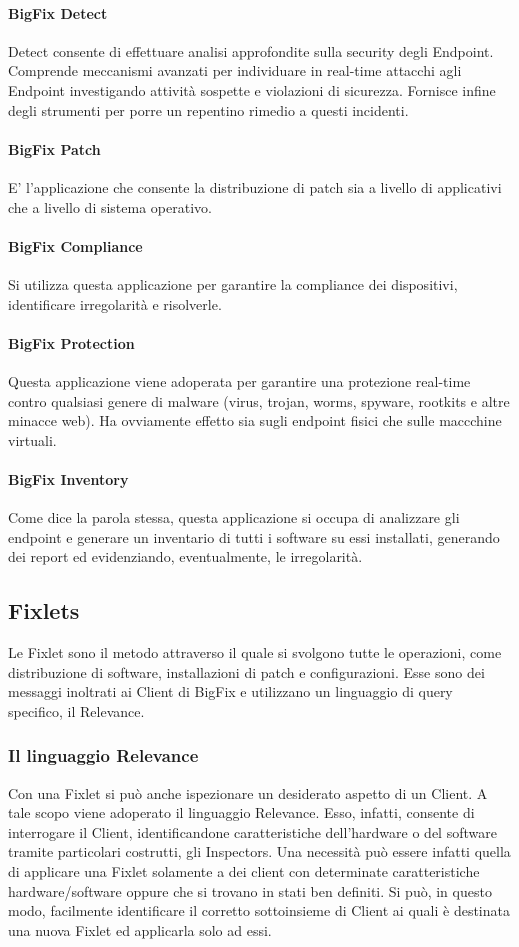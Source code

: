 \paragraph{BigFix Detect}
Detect consente di effettuare analisi approfondite sulla security degli Endpoint. Comprende meccanismi avanzati per individuare in real-time attacchi agli Endpoint investigando attività sospette e violazioni di sicurezza. Fornisce infine degli strumenti per porre un repentino rimedio a questi incidenti.
\paragraph{BigFix Patch}
E' l'applicazione che consente la distribuzione di patch sia a livello di applicativi che a livello di sistema operativo.
\paragraph{BigFix Compliance}
Si utilizza questa applicazione per garantire la compliance dei dispositivi, identificare irregolarità e risolverle.
\paragraph{BigFix Protection}
Questa applicazione viene adoperata per garantire una protezione real-time contro qualsiasi genere di malware (virus, trojan, worms, spyware, rootkits e altre minacce web). Ha ovviamente effetto sia sugli endpoint fisici che sulle maccchine virtuali.
\paragraph{BigFix Inventory}
Come dice la parola stessa, questa applicazione si occupa di analizzare gli endpoint e generare un inventario di tutti i software su essi installati, generando dei report ed evidenziando, eventualmente, le irregolarità.

\subsection{Fixlets}
Le Fixlet sono il metodo attraverso il quale si svolgono tutte le operazioni, come distribuzione di software, installazioni di patch e configurazioni. Esse sono dei messaggi inoltrati ai Client di BigFix e utilizzano un linguaggio di query specifico, il Relevance.
\subsubsection{Il linguaggio Relevance}
Con una Fixlet si può anche ispezionare un desiderato aspetto di un Client. A tale scopo viene adoperato il linguaggio Relevance. Esso, infatti, consente di interrogare il Client, identificandone caratteristiche dell'hardware o del software tramite particolari costrutti, gli Inspectors. Una necessità può essere infatti quella di applicare una Fixlet solamente a dei client con determinate caratteristiche hardware/software oppure che si trovano in stati ben definiti. Si può, in questo modo, facilmente identificare il corretto sottoinsieme di Client ai quali è destinata una nuova Fixlet ed applicarla solo ad essi.

